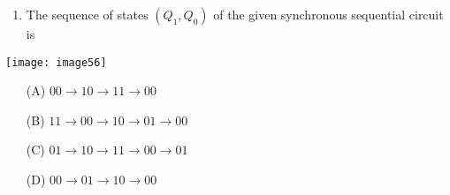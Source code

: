 \documentclass{article}
\begin{document}
\begin{enumerate}
    \item The sequence of states $(Q_1, Q_0)$ of the given synchronous sequential circuit is \underline{\hspace{2cm}}
\end{enumerate}

\begin{center}
	\texttt{[image: image56]}
\end{center}

\begin{enumerate}
    \item[(A)] $00 \rightarrow 10 \rightarrow 11 \rightarrow 00$
    \item[(B)] $11 \rightarrow 00 \rightarrow 10 \rightarrow 01 \rightarrow 00$
    \item[(C)] $01 \rightarrow 10 \rightarrow 11 \rightarrow 00 \rightarrow 01$
    \item[(D)] $00 \rightarrow 01 \rightarrow 10 \rightarrow 00$
\end{enumerate}
\end{document}
